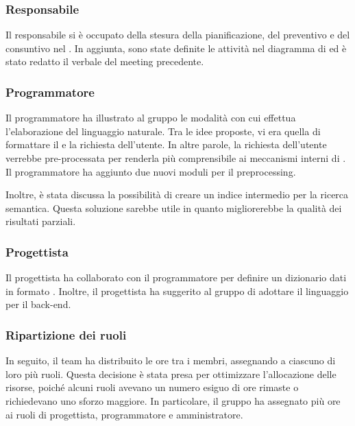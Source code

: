 \subsubsection{Responsabile} 
\par Il responsabile si è occupato della stesura della pianificazione, del preventivo e del consuntivo nel \PdP. In aggiunta, sono state definite le attività nel diagramma di  ed è stato redatto il verbale del meeting precedente.

\subsubsection{Programmatore}
\par Il programmatore ha illustrato al gruppo le modalità con cui  effettua l’elaborazione del linguaggio naturale. Tra le idee proposte, vi era quella di formattare il  e la richiesta dell'utente. In altre parole, la richiesta dell'utente verrebbe pre-processata per renderla più comprensibile ai meccanismi interni di . Il programmatore ha aggiunto due nuovi moduli per il preprocessing.

\par Inoltre, è stata discussa la possibilità di creare un indice intermedio per la ricerca semantica. Questa soluzione sarebbe utile in quanto migliorerebbe la qualità dei risultati parziali.

\subsubsection{Progettista}
\par Il progettista ha collaborato con il programmatore per definire un dizionario dati in formato . Inoltre, il progettista ha suggerito al gruppo di adottare il linguaggio  per il back-end.

\subsubsection{Ripartizione dei ruoli}
\par In seguito, il team ha distribuito le ore tra i membri, assegnando a ciascuno di loro più ruoli. Questa decisione è stata presa per ottimizzare l'allocazione delle risorse, poiché alcuni ruoli avevano un numero esiguo di ore rimaste o richiedevano uno sforzo maggiore. In particolare, il gruppo ha assegnato più ore ai ruoli di progettista, programmatore e amministratore. 

